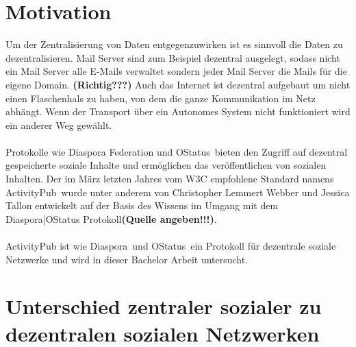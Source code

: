 \section{Motivation}
\label{sec:Introduction:Motivation}
	Um der Zentralisierung von Daten entgegenzuwirken ist es sinnvoll die Daten zu dezentralisieren. Mail Server sind zum Beispiel dezentral ausgelegt, sodass nicht ein Mail Server alle E-Mails verwaltet sondern jeder Mail Server die Mails für die eigene Domain. \textbf{(Richtig???)} Auch das Internet ist dezentral aufgebaut um nicht einen Flaschenhals zu haben, von dem die ganze Kommunikation im Netz abhängt. Wenn der Transport über ein Autonomes System nicht funktioniert wird ein anderer Weg gewählt. 
	\\\\Protokolle wie \glqq Diaspora Federation und OStatus\grqq~bieten den Zugriff auf dezentral gespeicherte soziale Inhalte und ermöglichen das veröffentlichen von sozialen Inhalten. Der im März letzten Jahres vom W3C empfohlene Standard namens \glqq ActivityPub\grqq~wurde unter anderem von Christopher Lemmert Webber und Jessica Tallon entwickelt auf der Basis des Wissens im Umgang mit dem Diaspora|OStatus Protokoll\textbf{(Quelle angeben!!!)}. 
	\\\\ActivityPub ist wie \glqq Diaspora\grqq~und \glqq OStatus\grqq~ein Protokoll für dezentrale soziale Netzwerke und wird in dieser Bachelor Arbeit untersucht.
\section{Unterschied zentraler sozialer zu dezentralen sozialen Netzwerken}
	